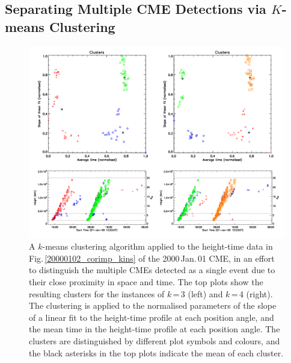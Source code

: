 \documentclass[referee,a4paper,12pt,traditabstract]{swsc}
\begin{document}
\begin{linenumbers}
\section{Separating Multiple CME Detections via $K$-means Clustering}
\label{sect_clusters}

\begin{figure}[ht]
\centerline{\includegraphics[width=\linewidth]{images/20000101_cluster_kins.pdf}}
\caption{A $k$-means clustering algorithm applied to the height-time data in Fig.\,\ref{20000102_corimp_kins} of the 2000\,Jan.\,01 CME, in an effort to distinguish the multiple CMEs detected as a single event due to their close proximity in space and time. The top plots show the resulting clusters for the instances of $k$\,=\,3 (left) and $k$\,=\,4 (right). The clustering is applied to the normalised parameters of the slope of a linear fit to the height-time profile at each position angle, and the mean time in the height-time profile at each position angle. The clusters are distinguished by different plot symbols and colours, and the black asterisks in the top plots indicate the mean of each cluster.}
\label{20000101_cluster_kins}
\end{figure}


\end{linenumbers}
\end{document}
